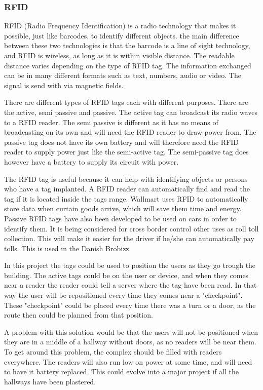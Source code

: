 \subsubsection{RFID}

RFID (Radio Frequency Identification) is a radio technology that makes it possible, just like barcodes, to identify different objects. the main difference between these two technologies is that the barcode is a line of sight technology, and RFID is wireless, as long as it is within visible distance. The readable distance varies depending on the type of RFID tag. The information exchanged can be in many different formats such as text, numbers, audio or video. The signal is send with via magnetic fields\cite{RFID_magnetic}.

There are different types of RFID tags each with different purposes. There are the active, semi passive and passive. The active tag can broadcast its radio waves to a RFID reader. The semi passive is different as it has no means of broadcasting on its own and will need the RFID reader to draw power from\cite{RFID_semiActive}. The passive tag does not have its own battery and will therefore need the RFID reader to supply power just like the semi-active tag. The semi-passive tag does however have a battery to supply its circuit with power\cite{RFID_AllTypes}.

The RFID tag is useful because it can help with identifying objects or persons who have a tag implanted\cite{RFID_FAQ}. A RFID reader can automatically find and read the tag if it is located inside the tags range. Wallmart uses RFID to automatically store data when curtain goods arrive, which will save them time and energy\cite{RFiD_inc}. Passive RFID tags have also been developed to be used on cars in order to identify them. It is being considered for cross border control other uses as roll toll collection\cite{RFID_car}. This will make it easier for the driver if he/she can automatically pay tolls. This is used in the Danish Brobizz\cite{RFID_brobizz}   

In this project the tags could be used to position the users as they go trough the building. The active tags could be on the user or device, and when they comes near a reader the reader could tell a server where the tag have been read. In that way the user will be repositioned every time they comes near a "checkpoint". These "checkpoint" could be placed every time there was a turn or a door, as the route then could be planned from that position.

A problem with this solution would be that the users will not be positioned when they are in a middle of a hallway without doors, as no readers will be near them. To get around this problem, the complex should be filled with readers everywhere. The readers will also run low on power at some time, and will need to have it battery replaced. This could evolve into a major project if all the hallways have been plastered.